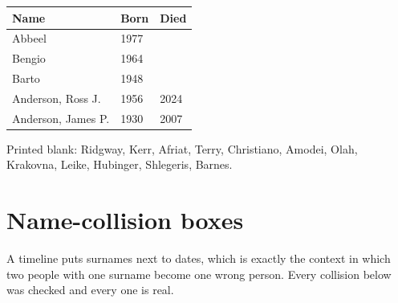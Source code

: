 \par\medskip
\noindent
\begin{tabularx}{\textwidth}{Xll}
\toprule
Name & Born & Died \\
\midrule
Abbeel & 1977 &  \\
Bengio & 1964 &  \\
Barto & 1948 &  \\
Anderson, Ross J. & 1956 & 2024 \\
Anderson, James P. & 1930 & 2007 \\
\bottomrule
\end{tabularx}
\par\medskip

Printed blank: Ridgway, Kerr, Afriat, Terry, Christiano, Amodei, Olah, Krakovna, Leike, Hubinger, Shlegeris, Barnes.

\section*{Name-collision boxes}

A timeline puts surnames next to dates, which is exactly the context in which two people with one surname become one wrong person. Every collision below was checked and every one is real.

\noindent

